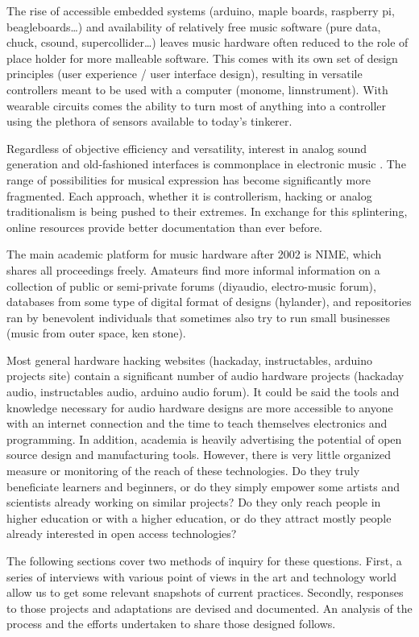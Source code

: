 The rise of accessible embedded systems (arduino, maple boards, raspberry pi, beagleboards…) and availability of relatively free music software (pure data, chuck, csound, supercollider…) leaves music hardware often reduced to the role of place holder for more malleable software. This comes with its own set of design principles (user experience / user interface design), resulting in versatile controllers meant to be used with a computer (monome, linnstrument). With wearable circuits comes the ability to turn most of anything into a controller using the plethora of sensors available to today’s tinkerer. 

Regardless of objective efficiency and versatility, interest in analog sound generation and old-fashioned interfaces is commonplace in electronic music \cite{collins2006}. The range of possibilities for musical expression has become significantly more fragmented. Each approach, whether it is controllerism, hacking or analog traditionalism is being pushed to their extremes. In exchange for this splintering, online resources provide better documentation than ever before.

The main academic platform for music hardware after 2002 is NIME, which shares all proceedings freely. Amateurs find more informal information on a collection of public or semi-private forums (diyaudio, electro-music forum), databases from some type of digital format of designs (hylander), and repositories ran by benevolent individuals that sometimes also try to run small businesses (music from outer space, ken stone).

Most general hardware hacking websites (hackaday, instructables, arduino projects site) contain a significant number of audio hardware projects (hackaday audio, instructables audio, arduino audio forum). It could be said the tools and knowledge necessary for audio hardware designs are more accessible to anyone with an internet connection and the time to teach themselves electronics and programming. In addition, academia is heavily advertising the potential of open source design and manufacturing tools. However, there is very little organized measure or monitoring of the reach of these technologies. Do they truly beneficiate learners and beginners, or do they simply empower some artists and scientists already working on similar projects? Do they only reach people in higher education or with a higher education, or do they attract mostly people already interested in open access technologies? 

The following sections cover two methods of inquiry for these questions. First, a series of interviews with various point of views in the art and technology world allow us to get some relevant snapshots of current practices. Secondly, responses to those projects and adaptations are devised and documented. An analysis of the process and the efforts undertaken to share those designed follows. 


